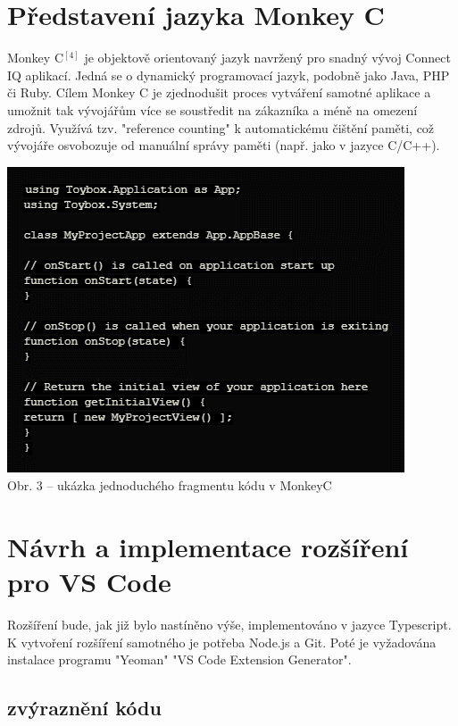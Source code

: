 \documentclass[czech,master,dept460,male,cpp,cpdeclaration]{diploma}
\begin{document}
\section{Představení jazyka Monkey C}
Monkey C$^{[4]}$  je objektově orientovaný jazyk navržený pro snadný vývoj Connect IQ aplikací. Jedná se o dynamický programovací jazyk, podobně jako Java, PHP či Ruby. Cílem Monkey C je zjednodušit proces vytváření samotné aplikace a umožnit tak vývojářům více se soustředit na zákazníka a méně na omezení zdrojů. Využívá tzv. "reference counting" k automatickému čištění paměti, což vývojáře osvobozuje od manuální správy paměti (např. jako v jazyce C/C++).
\\
\begin{center}
	\includegraphics{code_snippet}
	\\
	Obr. 3 – ukázka jednoduchého fragmentu kódu v MonkeyC
\end{center}
	

\section{Návrh a implementace rozšíření pro VS Code}
Rozšíření bude, jak již bylo nastíněno výše, implementováno v jazyce Typescript. 
K vytvoření rozšíření samotného je potřeba Node.js a Git. Poté je vyžadována instalace programu "Yeoman" "VS Code Extension Generator".

\subsection{zvýraznění kódu}
\end{document}
